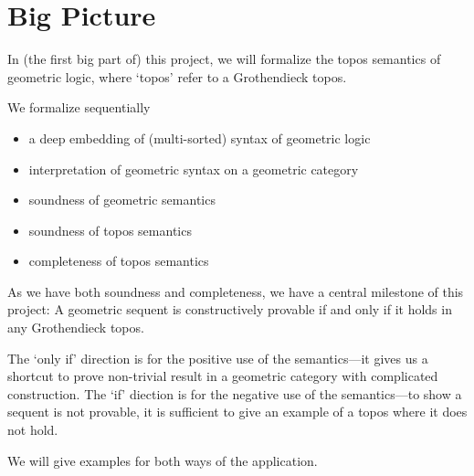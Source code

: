 %


\chapter{Big Picture}


In (the first big part of) this project, we will formalize the topos semantics of geometric logic, where `topos' refer to a Grothendieck topos.

We formalize sequentially
\begin{itemize}
  \item a deep embedding of (multi-sorted) syntax of geometric logic
  \item interpretation of geometric syntax on a geometric category
  \item soundness of geometric semantics
  \item soundness of topos semantics
  \item completeness of topos semantics
\end{itemize}

As we have both soundness and completeness, we have a central milestone of this project:
A geometric sequent is constructively provable if and only if it holds in any Grothendieck topos.

The `only if' direction is for the positive use of the semantics---it gives us a shortcut to prove non-trivial result in a geometric category with complicated construction.
The `if' diection is for the negative use of the semantics---to show a sequent is not provable, it is sufficient to give an example of a topos where it does not hold.

We will give examples for both ways of the application.



